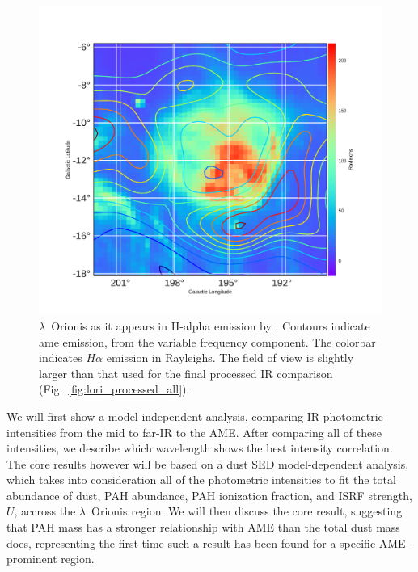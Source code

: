     \begin{figure}
       \includegraphics[width=\textwidth]{../Plots/ch_lori/LOri_halpha_AMEvarContours.pdf}
       \centering
       \caption{$\lambda$~Orionis as it appears in H-alpha emission by \cite{finkbeiner03}. Contours indicate \acrshort{ame} emission, from the variable frequency component. The colorbar indicates $H\alpha$ emission in Rayleighs. The field of view is slightly larger than that used for the final processed IR comparison (Fig.~\ref{fig:lori_processed_all}). }
       \label{fig:LOri_halpha_AMEvarContours}
     \end{figure}
    We will first show a model-independent analysis, comparing IR photometric intensities from the mid to far-IR to the AME. After comparing all of these intensities, we describe which wavelength shows the best intensity correlation. The core results however will be based on a dust SED model-dependent analysis, which takes into consideration all of the photometric intensities to fit the total abundance of dust, PAH abundance, PAH ionization fraction, and ISRF strength, $U$, accross the $\lambda$~Orionis region. We will then discuss the core result, suggesting that PAH mass has a stronger relationship with AME than the total dust mass does, representing the first time such a result has been found for a specific AME-prominent region.

